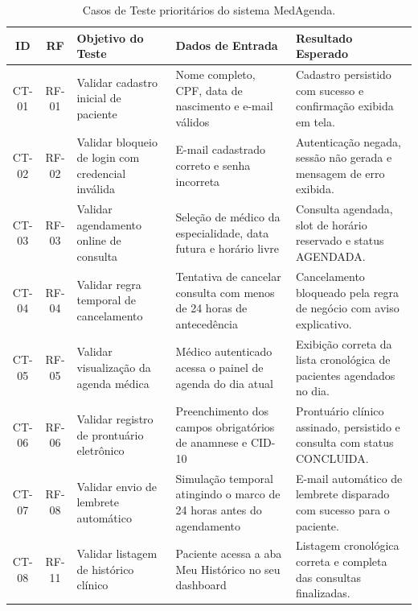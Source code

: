 \begin{table}[htbp]
\centering
\small
\caption{Casos de Teste prioritários do sistema MedAgenda.}
\label{tab:casos_teste}
\begin{tabularx}{\textwidth}{|c|c|>{\RaggedRight\arraybackslash}p{3.6cm}|>{\RaggedRight\arraybackslash}X|>{\RaggedRight\arraybackslash}p{4cm}|}
\hline
\textbf{ID} & \textbf{RF} & \textbf{Objetivo do Teste} & \textbf{Dados de Entrada} & \textbf{Resultado Esperado} \\
\hline
CT-01 & RF-01 & Validar cadastro inicial de paciente & Nome completo, CPF, data de nascimento e e-mail válidos & Cadastro persistido com sucesso e confirmação exibida em tela. \\
\hline
CT-02 & RF-02 & Validar bloqueio de login com credencial inválida & E-mail cadastrado correto e senha incorreta & Autenticação negada, sessão não gerada e mensagem de erro exibida. \\
\hline
CT-03 & RF-03 & Validar agendamento online de consulta & Seleção de médico da especialidade, data futura e horário livre & Consulta agendada, slot de horário reservado e status AGENDADA. \\
\hline
CT-04 & RF-04 & Validar regra temporal de cancelamento & Tentativa de cancelar consulta com menos de 24 horas de antecedência & Cancelamento bloqueado pela regra de negócio com aviso explicativo. \\
\hline
CT-05 & RF-05 & Validar visualização da agenda médica & Médico autenticado acessa o painel de agenda do dia atual & Exibição correta da lista cronológica de pacientes agendados no dia. \\
\hline
CT-06 & RF-06 & Validar registro de prontuário eletrônico & Preenchimento dos campos obrigatórios de anamnese e CID-10 & Prontuário clínico assinado, persistido e consulta com status CONCLUIDA. \\
\hline
CT-07 & RF-08 & Validar envio de lembrete automático & Simulação temporal atingindo o marco de 24 horas antes do agendamento & E-mail automático de lembrete disparado com sucesso para o paciente. \\
\hline
CT-08 & RF-11 & Validar listagem de histórico clínico & Paciente acessa a aba Meu Histórico no seu dashboard & Listagem cronológica correta e completa das consultas finalizadas. \\
\hline
\end{tabularx}\\
\autoria
\end{table}

